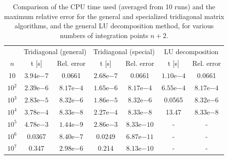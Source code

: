 \documentclass[a4paper,english]{article}
\begin{document}
\begin{table}[ht]
  \centering
  \begin{tabular}{c c c c c c c} \toprule
    & \multicolumn{2}{c}{Tridiagonal (general)} & \multicolumn{2}{c}{Tridiagonal (special)} & \multicolumn{2}{c}{LU decomposition}\\\cmidrule(lr){2-3} \cmidrule(lr){4-5} \cmidrule(lr){6-7}
    $n$ & t [s] & Rel. error & t [s] & Rel. error & t [s] & Rel. error \\\midrule
    10 & $3.94\mathrm{e}{-7}$ & 0.0661 & $2.68\mathrm{e}{-7}$ & 0.0661 & $1.10\mathrm{e}{-4}$ & 0.0661 \\
    $10^2$ & $2.39\mathrm{e}{-6}$ & $8.17\mathrm{e}{-4}$ & $1.65\mathrm{e}{-6}$ & $8.17\mathrm{e}{-4}$ & $6.55\mathrm{e}{-4}$ & $8.17\mathrm{e}{-4}$ \\
    $10^3$ & $2.83\mathrm{e}{-5}$ & $8.32\mathrm{e}{-6}$ & $1.86\mathrm{e}{-5}$ & $8.32\mathrm{e}{-6}$ & 0.0565 & $8.32\mathrm{e}{-6}$ \\
    $10^4$ & $3.78\mathrm{e}{-4}$ & $8.33\mathrm{e}{-8}$ & $2.27\mathrm{e}{-4}$ & $8.33\mathrm{e}{-8}$ & 13.47 & $8.33\mathrm{e}{-8}$ \\
    $10^5$ & $4.78\mathrm{e}{-3}$ & $1.44\mathrm{e}{-9}$ & $2.86\mathrm{e}{-3}$ & $8.33\mathrm{e}{-10}$ & - & - \\
    $10^6$ & 0.0367 & $8.40 \mathrm{e}{-7}$ & 0.0249 & $6.87 \mathrm{e}{-11}$ & - & - \\
    $10^7$ & 0.347 & $2.98 \mathrm{e}{-6}$ & 0.214 & $8.13 \mathrm{e}{-10}$ & - & - \\\bottomrule
  \end{tabular}
  \caption{Comparison of the CPU time used (averaged from 10 runs) and the maximum relative error for the general and specialized tridiagonal matrix algorithms, and the general LU decomposition method, for various numbers of integration points $n+2$.}
  \label{tab:mainresults}
\end{table}
\end{document}
